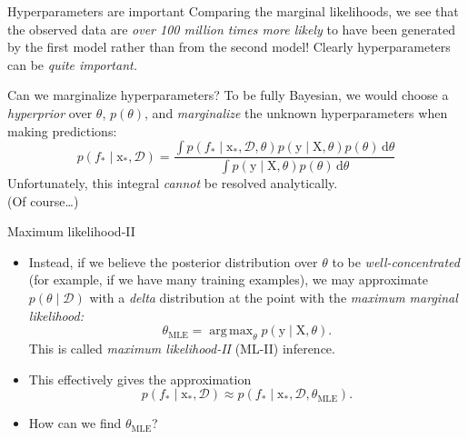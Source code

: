\documentclass[xcolor={dvipsnames},hyperref={breaklinks=true},12pt]{beamer}
\newcommand{\given}{\mid}
\newcommand{\mc}[1]{\mathcal{#1}}
\newcommand{\data}{\mc{D}}
\newcommand{\intd}[1]{\,\mathrm{d}{#1}}
\newcommand{\mat}[1]{\bm{\mathrm{#1}}}
\renewcommand{\vec}[1]{\bm{\mathrm{#1}}}
\newcommand{\emphr}[1]{{\textcolor{or}{\itshape #1}}}
\DeclareMathOperator*{\argmax}{arg\,max}
\begin{document}
\begin{frame}{Hyperparameters are important}
  Comparing the marginal likelihoods, we see that the observed data
  are \emphr{over 100 million times more likely} to have been
  generated by the first model rather than from the second model!
  Clearly hyperparameters can be \emphr{quite important.}
\end{frame}

\begin{frame}{Can we marginalize hyperparameters?}
  To be fully Bayesian, we would choose a \emphr{hyperprior}
  over $\theta$, $p(\theta)$, and \emphr{marginalize} the unknown
  hyperparameters when making predictions:
  \begin{equation*}
    p(f_\ast \given \vec{x}_\ast, \data) =
    \frac
    {\int
      p(f_\ast \given \vec{x}_\ast, \data, \theta)
      p(\vec{y} \given \mat{X}, \theta)
      p(\theta)
      \intd{\theta}
    }
    {\int
      p(\vec{y} \given \mat{X}, \theta)
      p(\theta)
      \intd{\theta}
    }
  \end{equation*}
  Unfortunately, this integral \emphr{cannot} be resolved
  analytically.\\[1ex]

  (Of course\dots)
\end{frame}

\begin{frame}{Maximum likelihood-II}
  \begin{itemize}
    \item Instead, if we believe the posterior distribution over
      $\theta$ to be \emphr{well-concentrated} (for example, if we
      have many training examples), we may approximate $p(\theta
      \given \data)$ with a \emphr{delta} distribution at the point
      with the \emphr{maximum marginal likelihood:}
      \begin{equation*}
        \theta_{\text{MLE}}
        =
        \argmax_\theta p(\vec{y} \given \mat{X}, \theta).
      \end{equation*}
      This is called \emphr{maximum likelihood-II} (ML-II) inference.
    \item
      This effectively gives the approximation
      \begin{equation*}
        p(f_\ast \given \vec{x}_\ast, \data)
        \approx
        p(f_\ast \given \vec{x}_\ast, \data, \theta_{\text{MLE}}).
      \end{equation*}
    \item
      How can we find $\theta_{\text{MLE}}$?
  \end{itemize}
\end{frame}
\end{document}
